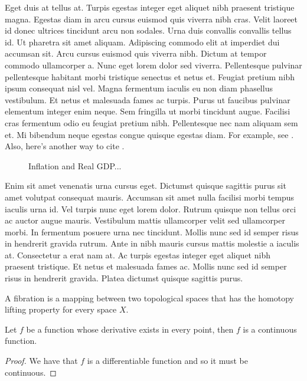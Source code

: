 \documentclass[12pt]{article}
\begin{document}
Eget duis at tellus at. Turpis egestas integer eget aliquet nibh praesent
tristique magna. Egestas diam in arcu cursus euismod quis viverra nibh cras.
Velit laoreet id donec ultrices tincidunt arcu non sodales. Urna duis
convallis convallis tellus id. Ut pharetra sit amet aliquam. Adipiscing
commodo elit at imperdiet dui accumsan sit. Arcu cursus euismod quis viverra
nibh. Dictum at tempor commodo ullamcorper a. Nunc eget lorem dolor sed
viverra. Pellentesque pulvinar pellentesque habitant morbi tristique senectus
et netus et. Feugiat pretium nibh ipsum consequat nisl vel. Magna fermentum
iaculis eu non diam phasellus vestibulum. Et netus et malesuada fames ac
turpis. Purus ut faucibus pulvinar elementum integer enim neque. Sem
fringilla ut morbi tincidunt augue. Facilisi cras fermentum odio eu feugiat
pretium nibh. Pellentesque nec nam aliquam sem et. Mi bibendum neque egestas
congue quisque egestas diam. For example, see \citet{fama1992cross}. Also, here's another
way to cite \citep{sharpe1964capital}.

\begin{figure}
\centering
\caption{Example plot}
  \centering
\caption*{
  Inflation and Real GDP...
  }
\label{fig:div-futures-habits-comparison}
\end{figure}

Enim sit amet venenatis urna cursus eget. Dictumst quisque sagittis purus sit
amet volutpat consequat mauris. Accumsan sit amet nulla facilisi morbi tempus
iaculis urna id. Vel turpis nunc eget lorem dolor. Rutrum quisque non tellus
orci ac auctor augue mauris. Vestibulum mattis ullamcorper velit sed
ullamcorper morbi. In fermentum posuere urna nec tincidunt. Mollis nunc sed
id semper risus in hendrerit gravida rutrum. Ante in nibh mauris cursus
mattis molestie a iaculis at. Consectetur a erat nam at. Ac turpis egestas
integer eget aliquet nibh praesent tristique. Et netus et malesuada fames ac.
Mollis nunc sed id semper risus in hendrerit gravida. Platea dictumst quisque
sagittis purus.

\begin{mydefinition}[Fibration]
  A fibration is a mapping between two topological spaces that has the homotopy lifting property for every space \(X\).
\end{mydefinition}

\begin{proposition}
  Let \(f\) be a function whose derivative exists in every point, then \(f\) is 
  a continuous function.
\end{proposition}
\begin{proof}
  We have that \(f\) is a differentiable function and so it must be continuous.
\end{proof}
\end{document}
